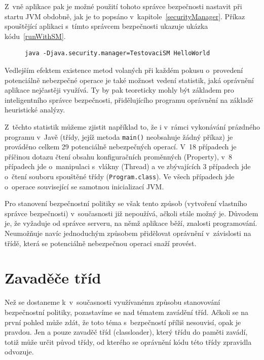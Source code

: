 Z~vně aplikace pak je možné použití tohoto správce bezpečnosti nastavit při startu JVM obdobně, jak je to popsáno v~kapitole~\ref{securityManager}. Příkaz spouštějící aplikaci s~tímto správcem bezpečnosti ukazuje ukázka kódu~\ref{runWithSM}.

\begin{figure}[tbh]
\begin{lstlisting}[caption=Spuštění aplikace s~vlastním správcem bezpečnosti, label=runWithSM]
java -Djava.security.manager=TestovaciSM HelloWorld
\end{lstlisting}
\end{figure}

Vedlejším efektem existence metod volaných při každém pokusu o~provedení potenciálně nebezpečné operace je také možnost vedení statistik, jaká oprávnění
aplikace nejčastěji využívá. Ty by pak teoreticky mohly být základem pro inteligentního správce bezpečnosti, přidělujícího programu oprávnění
na základě heuristické analýzy.

Z~těchto statistik můžeme zjistit například to, že i v~rámci vykonávání prázdného programu v~Javě (třídy, jejíž metoda {\tt main()} neobsahuje žádný příkaz) je prováděno celkem 29 potenciálně nebezpečných operací.
V~18 případech je příčinou dotazu čtení obsahu konfiguračních proměnných (Property), v~8 případech jde o~manipulaci s~vlákny (Thread) a ve zbývajících 3 případech jde o~čtení souboru spouštěné třídy ({\tt Program.class}). Ve všech případech jde o~operace související se samotnou inicializací JVM.

Pro stanovení bezpečnostní politiky se však tento způsob (vytvoření vlastního správce bezpečnosti) v~současnosti již nepoužívá, ačkoli stále možný je.
Důvodem je, že vyžaduje od správce serveru, na němž aplikace běží, znalosti programování.
Neumožňuje navíc jednoduchým způsobem přidělovat oprávnění v~závislosti na třídě, která se potenciálně nebezpečnou operaci snaží provést.

\section{Zavaděče tříd} \label{classloader}

Než se dostaneme k~v~současnosti využívanému způsobu stanovování bezpečnostní politiky, pozastavíme se nad tématem zavádění tříd.
Ačkoli se na první pohled může zdát, že toto téma s~bezpečností příliš nesouvisí, opak je pravdou.
Jen a pouze zavaděč tříd (classloader), který třídu do paměti zavádí, totiž může určit původ třídy, od kterého se oprávnění kódu této třídy zpravidla odvozuje.

